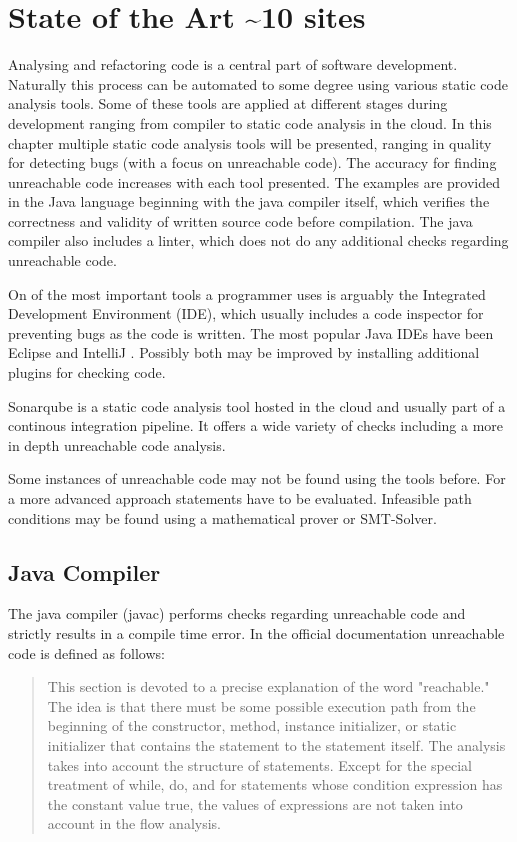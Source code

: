 
\chapter{State of the Art \textasciitilde 10 sites}
\label{cha:state of the art}

Analysing and refactoring code is a central part of software development. Naturally this process can be automated to some degree using various static code analysis tools. 
Some of these tools are applied at different stages during development ranging from compiler to static code analysis in the cloud.
In this chapter multiple static code analysis tools will be presented, ranging in quality for detecting bugs (with a focus on unreachable code).
The accuracy for finding unreachable code increases with each tool presented. 
The examples are provided in the Java language beginning with the java compiler itself, which verifies the correctness and validity of written source code before compilation. 
The java compiler also includes a linter, which does not do any additional checks regarding unreachable code. 


On of the most important tools a programmer uses is arguably the Integrated Development Environment (IDE), which usually includes a code inspector for preventing bugs as the code is written. 
The most popular Java IDEs have been Eclipse \cite{incCommunityOpenInnovation} and IntelliJ \cite{IntelliJIDEACapable}. 
Possibly both may be improved by installing additional plugins for checking code.


Sonarqube \cite{sonarqube} is a static code analysis tool hosted in the cloud and usually part of a continous integration pipeline. It offers a wide variety of checks including a more in depth unreachable code analysis.


Some instances of unreachable code may not be found using the tools before. For a more advanced approach statements have to be evaluated. Infeasible path conditions may be found using a mathematical prover or SMT-Solver.

\section{Java Compiler}
\label{sec:java compiler}

The java compiler (javac) performs checks regarding unreachable code and strictly results in a compile time error. 
In the official documentation \cite{Chapter14Blocks} unreachable code is defined as follows:
\begin{quote}
\label{quote:java unreachable definition}
This section is devoted to a precise explanation of the word "reachable." 
The idea is that there must be some possible execution path from the beginning of the constructor, method, instance initializer, or static initializer that contains the statement to the statement itself. The analysis takes into account the structure of statements. Except for the special treatment of while, do, and for statements whose condition expression has the constant value true, the values of expressions are not taken into account in the flow analysis.
\end{quote}

